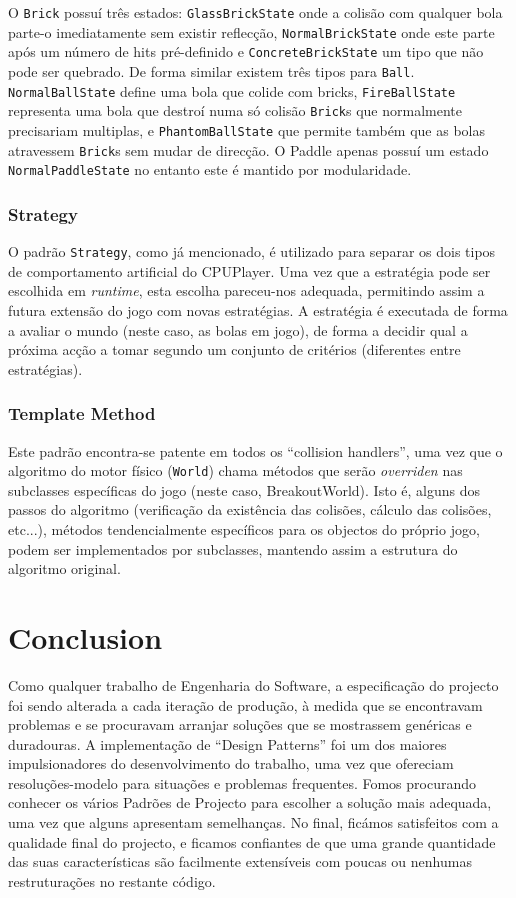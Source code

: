 \documentclass[a4paper]{article}
\begin{document}
O \texttt{Brick} possuí três estados: \texttt{GlassBrickState} onde a colisão com qualquer bola parte-o imediatamente sem existir reflecção, \texttt{NormalBrickState} onde este parte após um número de hits pré-definido e \texttt{ConcreteBrickState} um tipo que não pode ser quebrado. De forma similar existem três tipos para \texttt{Ball}. \texttt{NormalBallState} define uma bola que colide com bricks, \texttt{FireBallState} representa uma bola que destroí numa só colisão \texttt{Brick}s que normalmente precisariam multiplas, e \texttt{PhantomBallState} que permite também que as bolas atravessem \texttt{Brick}s sem mudar de direcção. O Paddle apenas possuí um estado \texttt{NormalPaddleState} no entanto este é mantido por modularidade.

\subsubsection{Strategy}
\noindent O padrão \texttt{Strategy}, como já mencionado, é utilizado para separar os dois tipos de comportamento artificial do CPUPlayer. Uma vez que a estratégia pode ser escolhida em \textit{runtime}, esta escolha pareceu-nos adequada, permitindo assim a futura extensão do jogo com novas estratégias. A estratégia é executada de forma a avaliar o mundo (neste caso, as bolas em jogo), de forma a decidir qual a próxima acção a tomar segundo um conjunto de critérios (diferentes entre estratégias).

\subsubsection{Template Method}
\noindent Este padrão encontra-se patente em todos os ``collision handlers'', uma vez que o algoritmo do motor físico (\texttt{World}) chama métodos que serão \textit{overriden} nas subclasses específicas do jogo (neste caso, BreakoutWorld). Isto é, alguns dos passos do algoritmo (verificação da existência das colisões, cálculo das colisões, etc...), métodos tendencialmente específicos para os objectos do próprio jogo, podem ser implementados por subclasses, mantendo assim a estrutura do algoritmo original.


\section{Conclusion}
\noindent Como qualquer trabalho de Engenharia do Software, a especificação do projecto foi sendo alterada a cada iteração de produção, à medida que se encontravam problemas e se procuravam arranjar soluções que se mostrassem genéricas e duradouras. A implementação de ``Design Patterns'' foi um dos maiores impulsionadores do desenvolvimento do trabalho, uma vez que ofereciam resoluções-modelo para situações e problemas frequentes. Fomos procurando conhecer os vários Padrões de Projecto para escolher a solução mais adequada, uma vez que alguns apresentam semelhanças. No final, ficámos satisfeitos com a qualidade final do projecto, e ficamos confiantes de que uma grande quantidade das suas características são facilmente extensíveis com poucas ou nenhumas restruturações no restante código.
\end{document}
